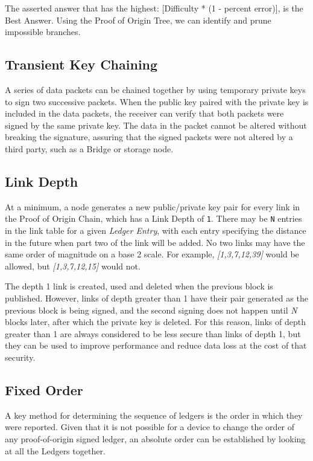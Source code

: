 \documentclass{article}
\begin{document}
The asserted answer that has the highest: [Difficulty * (1 - percent error)], is the Best Answer. Using the Proof of Origin Tree, we can identify and prune impossible branches.

\subsection{Transient Key Chaining}

A series of data packets can be chained together by using temporary private keys to sign two successive packets. When the public key paired with the private key is included in the data packets, the receiver can verify that both packets were signed by the same private key. The data in the packet cannot be altered without breaking the signature, assuring that the signed packets were not altered by a third party, such as a Bridge or storage node.

\subsection {Link Depth}
At a minimum, a node generates a new public/private key pair for every link in the Proof of Origin Chain, which has a Link Depth of \texttt{1}. There may be \texttt{N} entries in the link table for a given \textit{Ledger Entry}, with each entry specifying the distance in the future when part two of the link will be added. No two links may have the same order of magnitude on a base 2 scale. For example, \textit{[1,3,7,12,39]} would be allowed, but \textit{[1,3,7,12,15]} would not.

The depth 1 link is created, used and deleted when the previous block is published. However, links of depth greater than 1 have their pair generated as the previous block is being signed, and the second signing does not happen until \textit{N} blocks later, after which the private key is deleted. For this reason, links of depth greater than 1 are always considered to be less secure than links of depth 1, but they can be used to improve performance and reduce data loss at the cost of that security.

\subsection {Fixed Order}
A key method for determining the sequence of ledgers is the order in which they were reported. Given that it is not possible for a device to change the order of any \Gls{proof-of-origin} signed ledger, an absolute order can be established by looking at all the Ledgers together.
\end{document}
